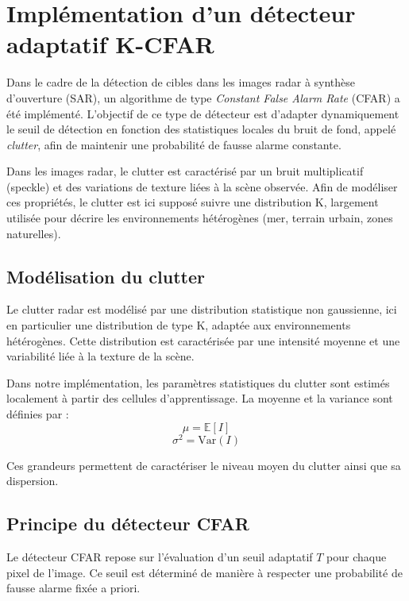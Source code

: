 \section{Implémentation d'un détecteur adaptatif K-CFAR}
\label{sec:kcfar}

Dans le cadre de la détection de cibles dans les images radar à synthèse d'ouverture (SAR), un algorithme de type \textit{Constant False Alarm Rate} (CFAR) a été implémenté. L’objectif de ce type de détecteur est d’adapter dynamiquement le seuil de détection en fonction des statistiques locales du bruit de fond, appelé \textit{clutter}, afin de maintenir une probabilité de fausse alarme constante.

 Dans les images radar, le clutter est caractérisé par un bruit multiplicatif (speckle) et des variations de texture liées à la scène observée. Afin de modéliser ces propriétés, le clutter est ici supposé suivre une distribution K, largement utilisée pour décrire les environnements hétérogènes (mer, terrain urbain, zones naturelles).

\subsection{Modélisation du clutter}

Le clutter radar est modélisé par une distribution statistique non gaussienne, ici en particulier une distribution de type K, adaptée aux environnements hétérogènes. Cette distribution est caractérisée par une intensité moyenne et une variabilité liée à la texture de la scène.

Dans notre implémentation, les paramètres statistiques du clutter sont estimés localement à partir des cellules d’apprentissage. La moyenne et la variance sont définies par :
\begin{equation}
    \mu = \mathbb{E}[I]
\end{equation}
\begin{equation}
    \sigma^2 = \mathrm{Var}(I)
\end{equation}

Ces grandeurs permettent de caractériser le niveau moyen du clutter ainsi que sa dispersion.

\subsection{Principe du détecteur CFAR}

Le détecteur CFAR repose sur l’évaluation d’un seuil adaptatif $T$ pour chaque pixel de l’image. Ce seuil est déterminé de manière à respecter une probabilité de fausse alarme fixée a priori.

